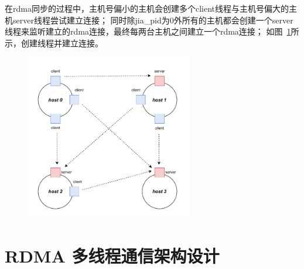 {\begin{algorithm}
\begin{algorithmic}[1]
            \State {}
            \EndFor
            \EndIf
            \EndProcedure
        \end{algorithmic}
    \end{algorithm}

    在rdma同步的过程中，主机号偏小的主机会创建多个client线程与主机号偏大的主机server线程尝试建立连接；
    同时除jia\_pid为0外所有的主机都会创建一个server线程来监听建立的rdma连接，最终每两台主机之间建立一个rdma连接；
    如图~\ref{fig:RDMA-connection-build}所示，创建线程并建立连接。



    \begin{figure}[H]
        \centering
        \includegraphics[width=0.65\textwidth]{Img/rdma_sync.drawio.pdf}
        \label{fig:RDMA-connection-build}
    \end{figure}






    \section{RDMA 多线程通信架构设计}

}
